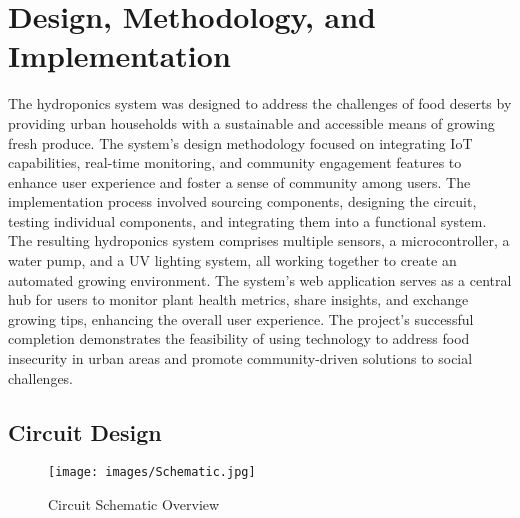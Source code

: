 \documentclass[12pt]{article} %
\newcommand{\comment}[1]{} %
\begin{document}
\comment {


\section*{Acknowledgment}
\addcontentsline{toc}{section}{Acknowledgment}
\lipsum[1] %

}

\pagebreak
\section{Design, Methodology, and Implementation}
\noindent The hydroponics system was designed to address the challenges of food deserts by providing urban households with a sustainable and accessible means of growing fresh produce. The system's design methodology focused on integrating IoT capabilities, real-time monitoring, and community engagement features to enhance user experience and foster a sense of community among users. The implementation process involved sourcing components, designing the circuit, testing individual components, and integrating them into a functional system. The resulting hydroponics system comprises multiple sensors, a microcontroller, a water pump, and a UV lighting system, all working together to create an automated growing environment. The system's web application serves as a central hub for users to monitor plant health metrics, share insights, and exchange growing tips, enhancing the overall user experience. The project's successful completion demonstrates the feasibility of using technology to address food insecurity in urban areas and promote community-driven solutions to social challenges.

\subsection{Circuit Design}
\noindent

\begin{figure}[H]
    \centering
    \texttt{[image: images/Schematic.jpg]}
    \caption{Circuit Schematic Overview}
    \label{fig:Schematic_Full}
\end{figure}
\end{document}
